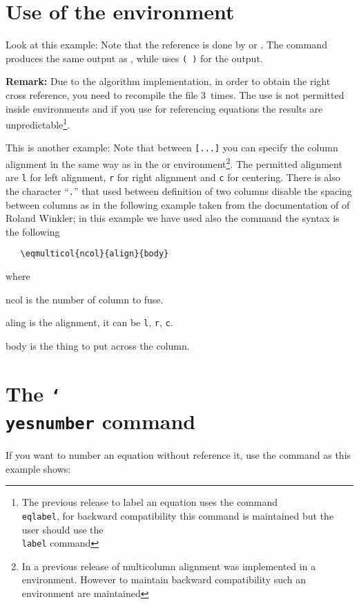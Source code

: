 \documentclass[a4paper]{article}
\begin{document}
\section{Use of the  environment}
Look at this example:
%
%
Note that the reference is done by  or . 
The command  produces the same output as ,
while  uses \texttt{( )} for the output.

\textbf{Remark:} Due to the algorithm implementation,
in order to obtain the right cross reference, you need
to recompile the file 3~times.  The use
 is not permitted inside  environments and
if you use  for referencing
equations the results are unpredictable\footnote{%
The previous release to label an equation uses the command
\texttt{\\eqlabel}, for backward compatibility this command
is maintained but the user should use the \texttt{\\label}
command
}.

This is another example:
%
%
Note that between \verb|[...]| you can specify the column alignment
in the same way as in the  or  
environment\footnote{In a previous release of 
multicolumn alignment was implemented in a  environment.
However to maintain backward compatibility such an environment
are maintained}.
The permitted alignment are \verb|l| for left alignment,
\verb|r| for right alignment and \verb|c| for centering. There is also
the character ``\verb'.''' that used between definition of two columns
disable the spacing between columns as in the following example taken 
from the documentation of  of Roland Winkler;
%
%
in this example we have used also the command  the 
syntax is the following
\begin{verbatim}
   \eqmulticol{ncol}{align}{body}
\end{verbatim}
where
\begin{dotlist}
  \item[ncol] is the number of column to fuse.
  \item[aling] is the alignment, it can be \verb'l',  \verb'r',  \verb'c'.
  \item[body] is the thing to put across the column.
\end{dotlist}

\section{The \texttt{\char`\\yesnumber} command}
If you want to number an equation without reference it, use the
 command as this example shows:
%
%
\end{document}
